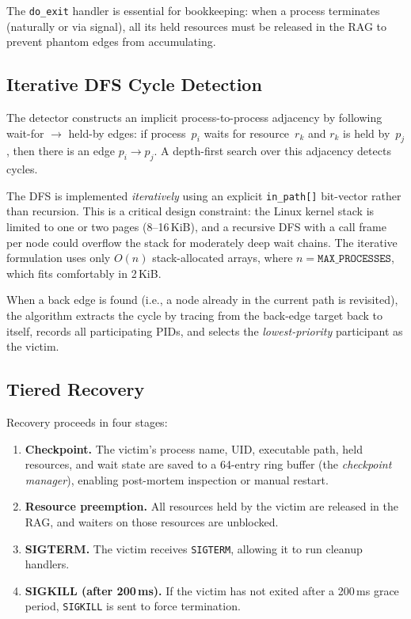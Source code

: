 \documentclass[11pt,letterpaper]{article}
\begin{document}
The \texttt{do\_exit} handler is essential for bookkeeping: when a
process terminates (naturally or via signal), all its held resources
must be released in the RAG to prevent phantom edges from accumulating.

\subsection{Iterative DFS Cycle Detection}

The detector constructs an implicit process-to-process adjacency by
following wait-for $\to$ held-by edges: if process~$p_i$ waits for
resource~$r_k$ and $r_k$ is held by~$p_j$, then there is an edge
$p_i \to p_j$.  A depth-first search over this adjacency detects
cycles.

The DFS is implemented \emph{iteratively} using an explicit
\texttt{in\_path[]} bit-vector rather than recursion.  This is a
critical design constraint: the Linux kernel stack is limited to one or
two pages (8--16\,KiB), and a recursive DFS with a call frame per node
could overflow the stack for moderately deep wait chains.  The iterative
formulation uses only $O(n)$ stack-allocated arrays, where
$n = \texttt{MAX\_PROCESSES}$, which fits comfortably in 2\,KiB.

When a back edge is found (i.e., a node already in the current path is
revisited), the algorithm extracts the cycle by tracing from the
back-edge target back to itself, records all participating PIDs, and
selects the \emph{lowest-priority} participant as the victim.

\subsection{Tiered Recovery}

Recovery proceeds in four stages:

\begin{enumerate}
\item \textbf{Checkpoint.}  The victim's process name, UID, executable
  path, held resources, and wait state are saved to a 64-entry ring
  buffer (the \emph{checkpoint manager}), enabling post-mortem
  inspection or manual restart.
\item \textbf{Resource preemption.}  All resources held by the victim
  are released in the RAG, and waiters on those resources are unblocked.
\item \textbf{SIGTERM.}  The victim receives \texttt{SIGTERM}, allowing
  it to run cleanup handlers.
\item \textbf{SIGKILL (after 200\,ms).}  If the victim has not exited
  after a 200\,ms grace period, \texttt{SIGKILL} is sent to force
  termination.
\end{enumerate}
\end{document}
